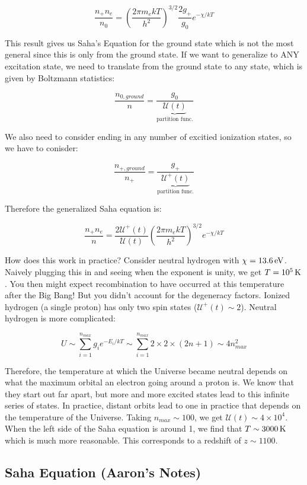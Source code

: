 \documentclass{article}
\newcommand{\unit}[1]{{\,\rm #1}}
\newcommand{\ev}{\unit{eV}}
\newcommand{\K}{\unit{K}}
\begin{document}
$$
\frac{n_+ n_e}{n_0} = \left(\frac{2 \pi m_e k T}{h^2}\right)^{3/2} \frac{2g_+}{g_0}e^{-\chi/kT}
$$

This result gives us Saha's Equation for the ground state which is not the most general since this is only from the ground state. If we want to generalize to ANY excitation state, we need to translate from the ground state to any state, which is given by Boltzmann statistics:

$$
\frac{n_{0,ground}}{n} = \frac{g_0}{\underbrace{\mathcal{U}(t)}_\text{partition func.}}
$$

We also need to consider ending in any number of excitied ionization states, so we have to conisder:

$$
\frac{n_{+,ground}}{n_+} = \frac{g_+}{\underbrace{\mathcal{U}^+(t)}_\text{partition func.}}
$$

Therefore the generalized Saha equation is:

$$
\frac{n_+ n_e}{n} = \frac{2 \mathcal{U}^+(t)}{\mathcal{U}(t)} \left(\frac{2 \pi m_e k T}{h^2}\right)^{3/2} e^{-\chi/kT}
$$

How does this work in practice? Consider neutral hydrogen with $\chi = 13.6 \ev$. Naively plugging this in and seeing when the exponent is unity, we get $T = 10^{5} \K$. You then might expect recombination to have occurred at this temperature after the Big Bang! But you didn't account for the degeneracy factors. Ionized hydrogen (a single proton) has only two spin states ($\mathcal{U}^+(t) \sim 2$). Neutral hydrogen is more complicated:

$$
U \sim \sum_{i=1}^{n_{max}} g_i e^{-E_i/kT} \sim \sum_{i=1}^{n_{max}} 2 \times 2 \times (2n+1)\sim 4 n_{max}^2
$$

Therefore, the temperature at which the Universe became neutral depends on what the maximum orbital an electron going around a proton is. We know that they start out far apart, but more and more excited states lead to this infinite series of states. In practice, distant orbits lead to one in practice that depends on the temperature of the Universe. Taking $n_{max} \sim 100$, we get $\mathcal{U}(t) \sim 4 \times 10^4$. When the left side of the Saha equation is around 1, we find that $T \sim 3000 \K$ which is much more reasonable. This corresponds to a redshift of $z \sim 1100$. 


\subsection{Saha Equation (Aaron's Notes)}
\end{document}
